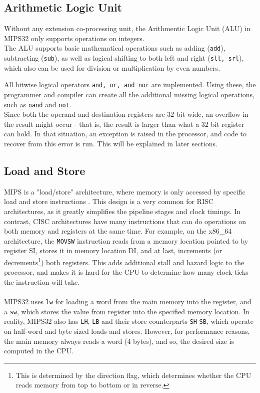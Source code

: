 \subsection{Arithmetic Logic Unit}
Without any extension co-processing unit, the Arithmentic Logic Unit (ALU) in
MIPS32 only supports operations on integers. \\
The ALU supports basic mathematical operations such as adding (\texttt{add}),
subtracting (\texttt{sub}), as well as logical shifting to both left and right
(\texttt{sll, srl}), which also can be used for division or multiplication by
even numbers.

All bitwise logical operators \texttt{and, or, and nor} are implemented. Using
these, the programmer and compiler can create all the additional missing logical operations, such as
\texttt{nand} and \texttt{not}.\\
Since both the operand and destination registers are 32 bit wide, an overflow
in the result might occur - that is, the result is larger than what a 32 bit
register can hold.
In that situation, an exception is raised in the processor, and code to recover
from this error is run\cite{COD5}. This will be explained in later sections.


\subsection{Load and Store}
MIPS is a "load/store" architecture, where memory is only accessed by specific
load and store instructions \cite{flynn1995computer}. This design is a very
common for RISC architectures, as it greatly simplifies the pipeline stages and
clock timings. In contrast, CISC architectures have many instructions that can
do operations on both memory and registers at the same time. For example, on
the x86\_64 architecture, the
\texttt{MOVSW} instruction reads from a memory location pointed to by register
SI, stores it in memory location DI, and at last, increments (or
decrements\footnote{This is determined by the direction flag, which determines
whether the CPU reads memory from top to bottom or in reverse.})
both registers\cite{intelmanual}. This adds additional stall and hazard logic to
the processor, and makes it is hard for the CPU to determine how many
clock-ticks the instruction will take.\\\\
MIPS32 uses \texttt{lw} for loading a word from the main memory into the register,
and a \texttt{sw}, which stores the value from register into the specified
memory location. In reality, MIPS32 also has \texttt{LH}, \texttt{LB} and
their store counterparts \texttt{SH} \texttt{SB}, which operate on half-word
and byte sized loads and stores. However, for performance reasons, the main
memory always reads a word (4 bytes), and so, the desired size is computed in
the CPU.



